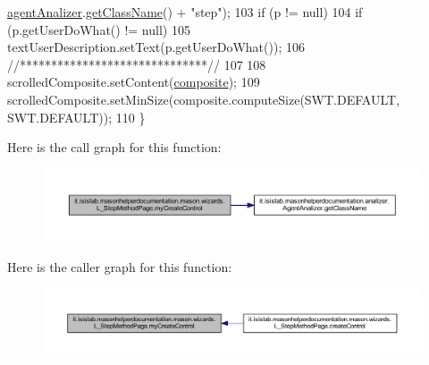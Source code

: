 \begin{DoxyCode}
      \hyperlink{classit_1_1isislab_1_1masonhelperdocumentation_1_1mason_1_1wizards_1_1_l___step_method_page_a0e0b633d8d346100b6ab65b05d9d60e6}{agentAnalizer}.\hyperlink{classit_1_1isislab_1_1masonhelperdocumentation_1_1analizer_1_1_agent_analizer_ace466e16439878a851eb63d5a11ddf43}{getClassName}() + \textcolor{stringliteral}{"step"});
103         \textcolor{keywordflow}{if} (p != null)
104             \textcolor{keywordflow}{if} (p.getUserDoWhat() != null)
105                 textUserDescription.setText(p.getUserDoWhat());
106         \textcolor{comment}{//******************************//}
107         
108         scrolledComposite.setContent(\hyperlink{classit_1_1isislab_1_1masonhelperdocumentation_1_1mason_1_1wizards_1_1_l___step_method_page_a73ff4ee05e8c5b36aed06fa604e32ac2}{composite});
109         scrolledComposite.setMinSize(composite.computeSize(SWT.DEFAULT, SWT.DEFAULT));
110     \}
\end{DoxyCode}


Here is the call graph for this function\-:\nopagebreak
\begin{figure}[H]
\begin{center}
\leavevmode
\includegraphics[width=350pt]{classit_1_1isislab_1_1masonhelperdocumentation_1_1mason_1_1wizards_1_1_l___step_method_page_aae5b5f889fca35447959d7f5f4f264a7_cgraph}
\end{center}
\end{figure}




Here is the caller graph for this function\-:\nopagebreak
\begin{figure}[H]
\begin{center}
\leavevmode
\includegraphics[width=350pt]{classit_1_1isislab_1_1masonhelperdocumentation_1_1mason_1_1wizards_1_1_l___step_method_page_aae5b5f889fca35447959d7f5f4f264a7_icgraph}
\end{center}
\end{figure}





